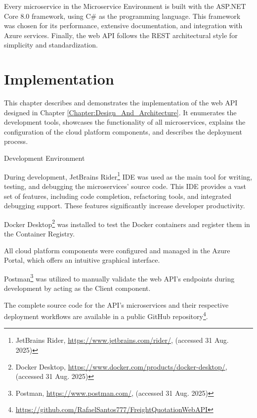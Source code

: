 \documentclass[12pt, reqno]{amsbook}
\makeatletter
\def\section{\@startsection{section}{1}%
      \z@{.5\linespacing\@plus.7\linespacing}{.25\linespacing}%
      {\normalfont\bfseries\flushleft}}
\theoremstyle{definition}
\theoremstyle{definition}
\numberwithin{section}{chapter}
\numberwithin{table}{chapter}
\numberwithin{figure}{chapter}
\makeatother
\begin{document}
Every microservice in the Microservice Environment is built with the ASP.NET Core 8.0 framework, using C\# as the programming language. This framework was chosen for its performance, extensive documentation, and integration with Azure services. Finally, the web \ac{API} follows the \ac{REST} architectural style for simplicity and standardization.

\chapter{Implementation}
\label{Chapter:Implementation}

This chapter describes and demonstrates the implementation of the web \ac{API} designed in Chapter \ref{Chapter:Design_And_Architecture}. It enumerates the development tools, showcases the functionality of all microservices, explains the configuration of the cloud platform components, and describes the deployment process.

\section{Development Environment}
\label{Section:Development_Environment}

During development, JetBrains Rider\footnote{JetBrains Rider, \url{https://www.jetbrains.com/rider/}, (accessed 31 Aug. 2025)} \ac{IDE} was used as the main tool for writing, testing, and debugging the microservices' source code. This \ac{IDE} provides a vast set of features, including code completion, refactoring tools, and integrated debugging support. These features significantly increase developer productivity.

Docker Desktop\footnote{Docker Desktop, \url{https://www.docker.com/products/docker-desktop/}, (accessed 31 Aug. 2025)} was installed to test the Docker containers and register them in the Container Registry.

All cloud platform components were configured and managed in the Azure Portal, which offers an intuitive graphical interface.

Postman\footnote{Postman, \url{https://www.postman.com/}, (accessed 31 Aug. 2025)} was utilized to manually validate the web \ac{API}'s endpoints during development by acting as the Client component.

The complete source code for the \ac{API}'s microservices and their respective deployment workflows are available in a public GitHub repository\footnote{\url{https://github.com/RafaelSantos777/FreightQuotationWebAPI}}.
\end{document}
